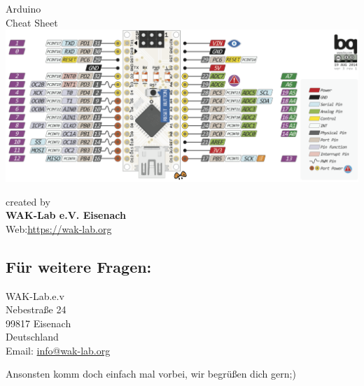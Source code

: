  



\begin{center}
	{\Large Arduino} \\[.3cm]
	{\huge {Cheat Sheet}}\\ [.3cm]
	
	\includegraphics[width=\linewidth, angle=270, scale=1.8]{pictures/nanoFull.png}\\
	\label{fig:Pinout}

	
	\vfill
	created by\\ 
	\textbf{WAK-Lab e.V. Eisenach}\\
	Web:\url{https://wak-lab.org}
\end{center}


\thispagestyle{empty} 
\newpage



\subsection{\large{Für weitere Fragen:}}
WAK-Lab.e.v\\
Nebestraße 24\\
99817 Eisenach\\
Deutschland\\
Email:  \url{info@wak-lab.org}

Ansonsten komm doch einfach mal vorbei, wir begrüßen dich gern;)

\newpage
\vspace*{\fill}
\begin{center}
\end{center}
\vspace*{\fill}



